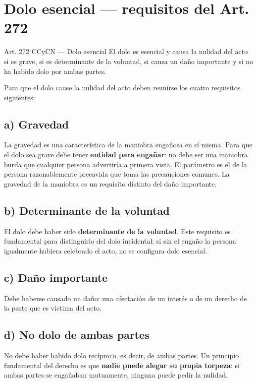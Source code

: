 \documentclass[12pt,oneside]{book}
\begin{document}
\section{Dolo esencial --- requisitos del Art. 272}

\begin{articulo}{Art. 272 CCyCN --- Dolo esencial}
El dolo es esencial y causa la nulidad del acto si es grave, si es determinante de la voluntad, si causa un daño importante y si no ha habido dolo por ambas partes.
\end{articulo}

Para que el dolo cause la nulidad del acto deben reunirse los cuatro requisitos siguientes:

\subsection*{a) Gravedad}

La gravedad es una característica de la maniobra engañosa en sí misma. Para que el dolo sea grave debe tener \textbf{entidad para engañar}: no debe ser una maniobra burda que cualquier persona advertiría a primera vista. El parámetro es el de la persona razonablemente precavida que toma las precauciones comunes. La gravedad de la maniobra es un requisito distinto del daño importante.

\subsection*{b) Determinante de la voluntad}

El dolo debe haber sido \textbf{determinante de la voluntad}. Este requisito es fundamental para distinguirlo del dolo incidental: si sin el engaño la persona igualmente hubiera celebrado el acto, no se configura dolo esencial.

\subsection*{c) Daño importante}

Debe haberse causado un daño: una afectación de un interés o de un derecho de la parte que es víctima del acto.

\subsection*{d) No dolo de ambas partes}

No debe haber habido dolo recíproco, es decir, de ambas partes. Un principio fundamental del derecho es que \textbf{nadie puede alegar su propia torpeza}: si ambas partes se engañaban mutuamente, ninguna puede pedir la nulidad.
\end{document}

